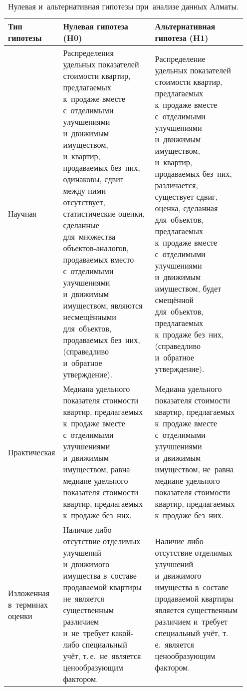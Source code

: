 \documentclass[]{scrreprt}
\begin{document}
\begin{table}[ht]
	\caption{Нулевая и~альтернативная гипотезы при~анализе данных Алматы.}  \label{tab:nul-alt-hypothesis-almaty}
	\centering
	\begin{tabularx}{\textwidth}{p{0.15\linewidth} p{0.4\linewidth} p{0.4\linewidth}} 
		\hline
		Тип гипотезы&Нулевая гипотеза (H0)&Альтернативная гипотеза (H1)\\
		\hline
		Научная&Распределения удельных показателей стоимости квартир, предлагаемых к~продаже вместе с~отделимыми улучшениями и~движимым имуществом, и~квартир, продаваемых без~них, одинаковы, сдвиг между ними отсутствует, статистические оценки, сделанные для~множества объектов-аналогов, продаваемых вместо с~отделимыми улучшениями и~движимым имуществом, являются несмещёнными для~объектов, продаваемых без~них, (справедливо и~обратное утверждение).&Распределение удельных показателей стоимости квартир, предлагаемых к~продаже вместе с~отделимыми улучшениями и~движимым имуществом, и~квартир, продаваемых без~них, различается, существует сдвиг, оценка, сделанная для~объектов, предлагаемых к~продаже вместе с~отделимыми улучшениями и~движимым имуществом, будет смещённой для~объектов, предлагаемых к~продаже без~них, (справедливо и~обратное утверждение).\\
		\hline
		Практическая&Медиана удельного показателя стоимости квартир, предлагаемых к~продаже вместе с~отделимыми улучшениями и~движимым имуществом, равна медиане удельного показателя стоимости квартир, предлагаемых к~продаже без~них.&Медиана удельного показателя стоимости квартир, предлагаемых к~продаже вместе с~отделимыми улучшениями и~движимым имуществом, не~равна медиане удельного показателя стоимости квартир, предлагаемых к~продаже без~них.\\
		\hline
		Изложенная в~терминах оценки&Наличие либо отсутствие отделимых улучшений и~движимого имущества в~составе продаваемой квартиры не~является существенным различием и~не~требует какой-либо специальный учёт, т.\,е.~не~является ценообразующим фактором.&Наличие либо отсутствие отделимых улучшений и~движимого имущества в~составе продаваемой квартиры является существенным различием и~требует специальный учёт, т.\,е.~является ценообразующим фактором.\\
		\hline
	\end{tabularx}
\end{table}
\end{document}
